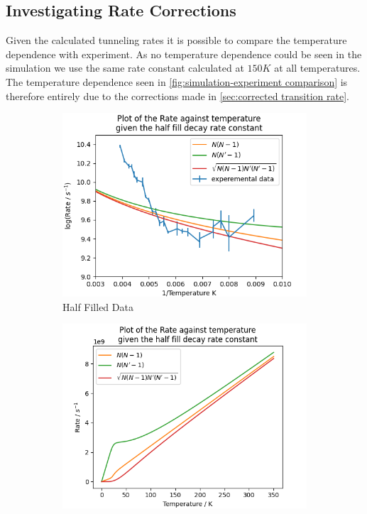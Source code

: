 \subsection{Investigating Rate Corrections}
Given the calculated tunneling rates
it is possible to compare
the temperature dependence
with experiment.
As no temperature dependence
could be seen in the
simulation we use
the same rate constant calculated
at \(150K\) at all temperatures.
The temperature dependence
seen in \cref{fig:simulation-experiment comparison}
is therefore entirely
due to the corrections
made in
\cref{sec:corrected transition rate}.
\begin{figure}[htbp]
    \centering
    \begin{subfigure}{0.45\linewidth}
        \centering
        \includegraphics[width =0.9 \linewidth]{Figures/Simulation/Decay rate against temperature half fill 150K 1 spin.png}
        \caption{Half Filled Data
        }\label{sub@fig:half filled rates with experiment}
    \end{subfigure}
    \hfill
    \begin{subfigure}{0.45\linewidth}
        \centering
        \includegraphics[width = 0.9\linewidth]{Figures/Simulation/Decay rate against temperature half fill 150K 1 spin low temp.png}

\end{subfigure}
\end{figure}
